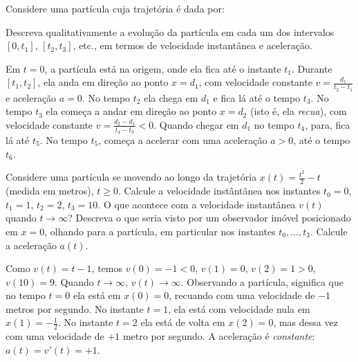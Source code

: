 \begin{exo}
Considere uma partícula cuja trajetória é dada por:
\begin{center}
\begin{bmlimage}\end{bmlimage}
\end{center}
Descreva qualitativamente a evolução da partícula em cada um dos intervalos $[0,t_1]$,
$[t_2,t_3]$, etc., em termos de velocidade instantânea e aceleração.
\begin{sol}  Em $t=0$, a partícula está na origem, onde ela fica até o instante
$t_1$. Durante $[t_1,t_2]$, ela anda em direção ao ponto $x=d_1$, com
velocidade constante $v=\frac{d_1}{t_2-t_1}$ e aceleração $a=0$. No tempo $t_2$
ela chega em $d_1$
e fica lá até o tempo $t_3$. No tempo $t_3$ ela começa a andar em direção ao
ponto $x=d_2$ (isto é, ela \emph{recua}), com velocidade constante
$v=\frac{d_2-d_1}{t_4-t_3}<0$. Quando chegar em $d_1$ no tempo $t_4$, para, fica
lá até $t_5$. No tempo $t_5$, começa a acelerar com uma aceleração $a>0$, até
o tempo $t_6$.
\end{sol}
\end{exo}

\begin{exo}
Considere uma partícula se movendo ao longo da trajetória
$x(t)=\frac{t^2}{2}-t$ (medida em metros), $t\geq 0$.
Calcule a velocidade instântânea nos instantes $t_0=0$, $t_1=1$,
$t_2=2$, $t_3=10$. O que acontece com a velocidade instantânea $v(t)$ quando
$t\to \infty$? Descreva o que seria visto por um observador imóvel
posicionado em $x=0$, olhando para a partícula, em particular nos instantes
$t_0,\dots,t_3$.
Calcule a aceleração $a(t)$.
\begin{sol}
Como $v(t)=t-1$, temos $v(0)=-1<0$, $v(1)=0$, $v(2)=1>0$, $v(10)=9$.
Quando $t\to \infty$, $v(t)\to\infty$.
Observando a partícula, significa que no tempo $t=0$ ela está em
$x(0)=0$, recuando com uma velocidade de $-1$ metros por segundo. No instante
$t=1$, ela está com velocidade nula em $x(1)=-\frac12$. No instante $t=2$ ela
está de volta em $x(2)=0$, mas dessa vez com uma velocidade de $+1$ metro por
segundo.
A aceleração é \emph{constante}: $a(t)=v'(t)=+1$.
\end{sol}
\end{exo}

